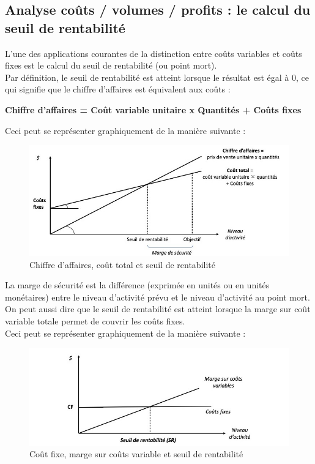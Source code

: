 \documentclass{kaobook}
\begin{document}
\subsection{Analyse coûts / volumes / profits : le calcul du seuil de rentabilité}
\label{sec:orgde7b65a}
L'une des applications courantes de la distinction entre coûts variables et coûts fixes est le calcul du seuil de rentabilité (ou point mort).\\
Par définition, le seuil de rentabilité est atteint lorsque le résultat est égal à 0, ce qui signifie que le chiffre d'affaires est équivalent aux coûts :\\
\begin{center}
\textbf{Chiffre d'affaires = Coût variable unitaire x Quantités + Coûts fixes}\\
\end{center}
Ceci peut se représenter graphiquement de la manière suivante :\\
\begin{figure}[htbp]
\centering
\includegraphics[width=.9\linewidth]{./img/srcact.jpeg}
\caption{Chiffre d'affaires, coût total et seuil de rentabilité}
\end{figure}
La marge de sécurité est la différence (exprimée en unités ou en unités monétaires) entre le niveau d'activité prévu et le niveau d'activité au point mort.\\

On peut aussi dire que le seuil de rentabilité est atteint lorsque la marge sur coût variable totale permet de couvrir les coûts fixes.\\
Ceci peut se représenter graphiquement de la manière suivante :\\
\begin{figure}[htbp]
\centering
\includegraphics[width=.9\linewidth]{./img/srmcvcf.jpeg}
\caption{Coût fixe, marge sur coûts variable et seuil de rentabilité}
\end{figure}
\end{document}
